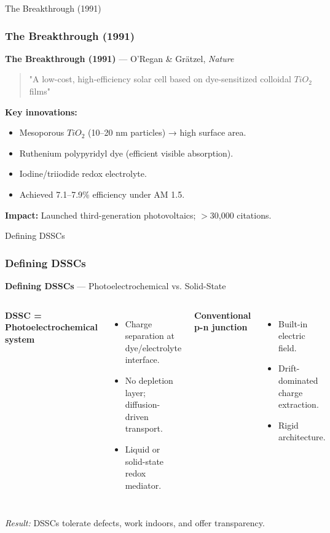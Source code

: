 \documentclass[aspectratio=169]{beamer}
\begin{document}
\begin{frame}{The Breakthrough (1991)}
\frametitle{The Breakthrough (1991)}

\textbf{The Breakthrough (1991)} — O'Regan \& Grätzel, \textit{Nature
}
\begin{quote}
"A low-cost, high-efficiency solar cell based on dye-sensitized colloidal $TiO_2$ films"
\end{quote}
\textbf{Key innovations:}
\begin{itemize}
\item Mesoporous $TiO_2$ (10–20 nm particles) → high surface area.
\item Ruthenium polypyridyl dye (efficient visible absorption).
\item Iodine/triiodide redox electrolyte.
\item Achieved 7.1–7.9\% efficiency under AM 1.5.
\end{itemize}
\textbf{Impact:} Launched third-generation photovoltaics; $>$30,000 citations.
\cite{ORegan1991}
\end{frame}


\begin{frame}{Defining DSSCs}
\frametitle{Defining DSSCs}

\textbf{Defining DSSCs} — Photoelectrochemical vs. Solid-State
\begin{columns}
\textbf{DSSC = Photoelectrochemical system}
\begin{itemize}
\item Charge separation at dye/electrolyte interface.
\item No depletion layer; diffusion-driven transport.
\item Liquid or solid-state redox mediator.
\end{itemize}
\textbf{Conventional p-n junction}
\begin{itemize}
\item Built-in electric field.
\item Drift-dominated charge extraction.
\item Rigid architecture.
\end{itemize}
\end{columns}
\vspace{3mm}
\textit{Result:} DSSCs tolerate defects, work indoors, and offer transparency.
\cite{Peter2007}
\end{frame}
\end{document}
